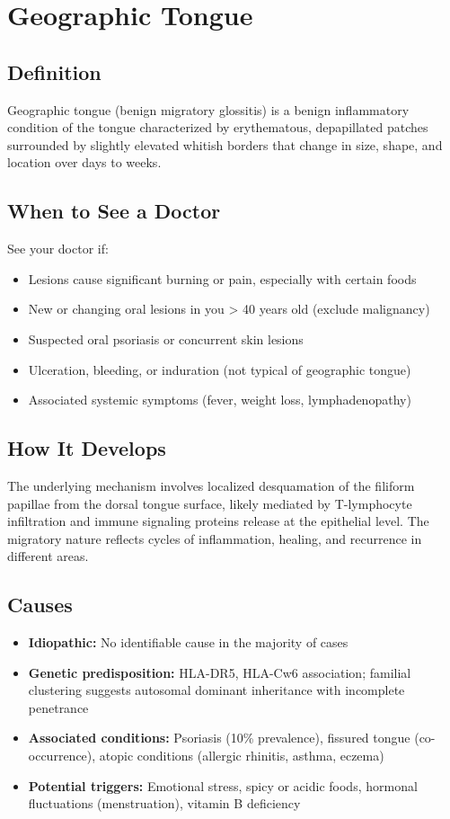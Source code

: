 \chapter{Geographic Tongue}

\section*{Definition}
Geographic tongue (benign migratory glossitis) is a benign inflammatory condition of the tongue characterized by erythematous, depapillated patches surrounded by slightly elevated whitish borders that change in size, shape, and location over days to weeks.

\section*{When to See a Doctor}
See your doctor if:
\begin{itemize}
  \item Lesions cause significant burning or pain, especially with certain foods
  \item New or changing oral lesions in you > 40 years old (exclude malignancy)
  \item Suspected oral psoriasis or concurrent skin lesions
  \item Ulceration, bleeding, or induration (not typical of geographic tongue)
  \item Associated systemic symptoms (fever, weight loss, lymphadenopathy)
\end{itemize}

\section*{How It Develops}
The underlying mechanism involves localized desquamation of the filiform papillae from the dorsal tongue surface, likely mediated by T-lymphocyte infiltration and immune signaling proteins release at the epithelial level. The migratory nature reflects cycles of inflammation, healing, and recurrence in different areas.

\section*{Causes}
\begin{itemize}
  \item \textbf{Idiopathic:} No identifiable cause in the majority of cases
  \item \textbf{Genetic predisposition:} HLA-DR5, HLA-Cw6 association; familial clustering suggests autosomal dominant inheritance with incomplete penetrance
  \item \textbf{Associated conditions:} Psoriasis (10\% prevalence), fissured tongue (co-occurrence), atopic conditions (allergic rhinitis, asthma, eczema)
  \item \textbf{Potential triggers:} Emotional stress, spicy or acidic foods, hormonal fluctuations (menstruation), vitamin B deficiency
\end{itemize}

